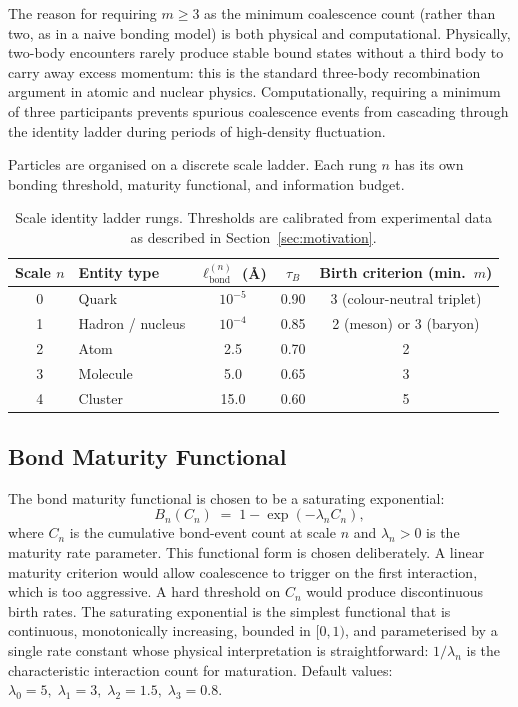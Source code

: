 \documentclass[11pt,a4paper]{article}
\newcommand{\lbond}{\ell_{\mathrm{bond}}}
\begin{document}
The reason for requiring $m \geq 3$ as the minimum coalescence count
(rather than two, as in a naive bonding model) is both physical and
computational.  Physically, two-body encounters rarely produce stable bound
states without a third body to carry away excess momentum: this is the
standard three-body recombination argument in atomic and nuclear physics.
Computationally, requiring a minimum of three participants prevents spurious
coalescence events from cascading through the identity ladder during periods
of high-density fluctuation.

Particles are organised on a discrete scale ladder.  Each rung $n$ has its own
bonding threshold, maturity functional, and information budget.

\begin{table}[H]
\centering
\caption{Scale identity ladder rungs.  Thresholds are calibrated from
  experimental data as described in Section~\ref{sec:motivation}.}
\label{tab:ladder}
\begin{tabular}{@{}clccc@{}}
\toprule
Scale $n$ & Entity type & $\lbond^{(n)}$ (\AA) &
  $\tau_B$ & Birth criterion (min.\ $m$) \\
\midrule
0 & Quark & $10^{-5}$ & 0.90 & 3 (colour-neutral triplet) \\
1 & Hadron / nucleus & $10^{-4}$ & 0.85 & 2 (meson) or 3 (baryon) \\
2 & Atom & 2.5 & 0.70 & 2 \\
3 & Molecule & 5.0 & 0.65 & 3 \\
4 & Cluster & 15.0 & 0.60 & 5 \\
\bottomrule
\end{tabular}
\end{table}

\subsection{Bond Maturity Functional}

The bond maturity functional is chosen to be a saturating exponential:
\[
  B_n(C_n) \;=\; 1 - \exp\!\left(-\lambda_n C_n\right),
\]
where $C_n$ is the cumulative bond-event count at scale $n$ and
$\lambda_n > 0$ is the maturity rate parameter.  This functional form is
chosen deliberately.  A linear maturity criterion would allow coalescence
to trigger on the first interaction, which is too aggressive.  A hard
threshold on $C_n$ would produce discontinuous birth rates.  The saturating
exponential is the simplest functional that is continuous, monotonically
increasing, bounded in $[0,1)$, and parameterised by a single rate constant
whose physical interpretation is straightforward: $1/\lambda_n$ is the
characteristic interaction count for maturation.  Default values:
$\lambda_0 = 5,\; \lambda_1 = 3,\; \lambda_2 = 1.5,\; \lambda_3 = 0.8$.
\end{document}
